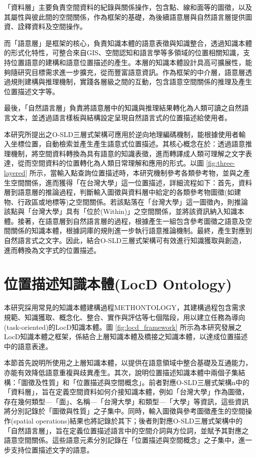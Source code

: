 「資料層」主要負責空間資料的紀錄與關係操作，包含點、線和面等的圖徵，以及其屬性與彼此間的空間關係，作為框架的基礎，為後續語意層與自然語言層提供圖資、詮釋資料及空間操作。

而「語意層」是框架的核心，負責知識本體的語意表徵與知識整合，透過知識本體的形式化特性，可整合來自GIS、空間認知和語言學等多領域的位置相關知識，支持位置語意的建構和語意位置描述的產生。本層的知識本體設計具高可擴展性，能夠隨研究目標需求進一步擴充，從而豐富語意資訊。作為框架的中介層，語意層透過規則建構與推理機制，實踐各層級之間的互動，包含語意空間關係的推理及產生位置描述文字等。

最後，「自然語言層」負責將語意層中的知識與推理結果轉化為人類可讀之自然語言文本，並透過語言樣板與結構設定呈現自然語言式的位置描述給使用者。

本研究所提出之O-SLD三層式架構可應用於逆向地理編碼機制，能根據使用者輸入坐標位置，自動檢索並產生產生語意式位置描述。其核心概念在於：透過語意推理機制，將空間資料轉換為具有語意的知識表徵，進而轉譯成人類可理解之文字表達，從而空間資料的位置轉化為人類日常理解和應用的形式。以圖 \ref{fig:three-layered} 所示，當輸入點查詢位置描述時，本研究機制參考各類參考物，並與之產生空間關係，進而獲得「在台灣大學」這一位置描述，詳細流程如下：首先，資料層到語意層的推論過程，判斷輸入圖徵與資料層中給定的各類參考物圖徵(如建物、行政區或地標等)之空間關係。若該點落在「台灣大學」這一圖徵內，則推論該點與「台灣大學」具有「位於(Within)」之空間關係，並將該資訊納入知識本體。接著，在語意層到自然語言層的過程，根據產生一組包含參考圖徵之語意及空間關係的知識本體，根據詞庫的規則進一步執行語意推論機制。最終，產生對應到自然語言式之文字。因此，結合O-SLD三層式架構可有效進行知識獲取與創造，進而轉換為文字式的位置描述。

\section{位置描述知識本體(LocD Ontology)}

本研究採用常見的知識本體建構過程METHONTOLOGY\parencite{RN143}，其建構過程包含需求規範、知識獲取、概念化、整合、實作與評估等七個階段，用以建立任務為導向(task-oriented)的LocD知識本體。圖 \ref{fig:locd_framework} 所示為本研究發展之LocD知識本體之框架，係結合上層知識本體及橋接之知識本體，以達成位置描述中的語意表達。

本節首先說明所使用之上層知識本體，以提供在語意領域中整合基礎及互通能力，亦能有效降低語意重複與歧異產生。其次，說明位置描述知識本體中兩個子集結構：「圖徵及性質」和「位置描述與空間概念」。前者對應O-SLD三層式架構n中的「資料層」，旨在定義空間資料如何介接知識本體，例如「台灣大學」作為圖徵，存在幾何類型—「面」、名稱—「台灣大學」和類型—「大學」等資訊，這些資訊將分別記錄於「圖徵與性質」之子集中。同時，輸入圖徵與參考圖徵產生的空間操作(spatial operations)結果也將記錄於其下；後者則對應O-SLD三層式架構中的「自然語言層」，旨在定義位置描述語言中的空間介詞與方位詞，並賦予其對應之語意空間關係。這些語意元素分別記錄在「位置描述與空間概念」之子集中，進一步支持位置描述文字的語意。

